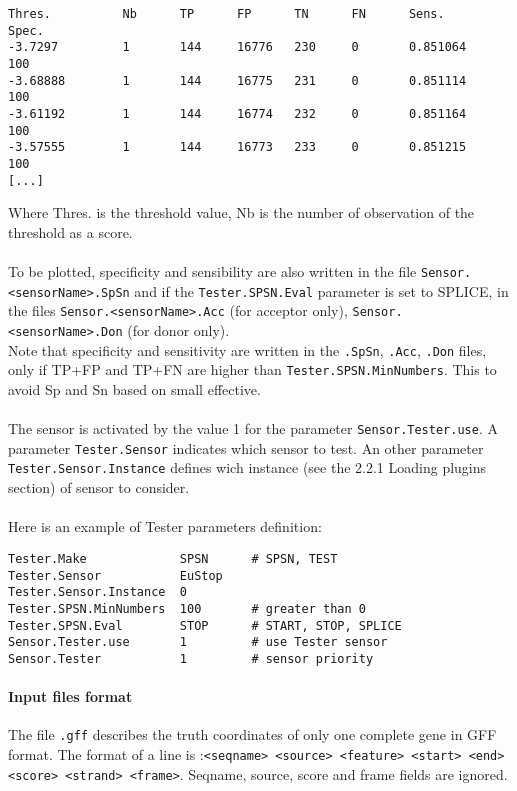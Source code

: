 \begin{Verbatim}[fontsize=\small]
Thres.          Nb      TP      FP      TN      FN      Sens.           Spec.
-3.7297         1       144     16776   230     0       0.851064        100
-3.68888        1       144     16775   231     0       0.851114        100
-3.61192        1       144     16774   232     0       0.851164        100
-3.57555        1       144     16773   233     0       0.851215        100
[...]
\end{Verbatim}
Where Thres. is the threshold value, Nb is the number of observation of the threshold as a score.\\ 
\\ 
To be plotted, specificity and sensibility are also written in the file \texttt{Sensor.<sensorName>.SpSn} and if the \texttt{Tester.SPSN.Eval} parameter is set to SPLICE, in the files 
\texttt{Sensor.<sensorName>.Acc} (for acceptor only), \texttt{Sensor.<sensorName>.Don} (for donor only).\\ 
Note that specificity and sensitivity are written in the \texttt{.SpSn}, \texttt{.Acc}, \texttt{.Don} files, only if TP+FP and TP+FN are higher than \texttt{Tester.SPSN.MinNumbers}. This to avoid Sp and Sn based on small effective.\\
\\
The sensor is activated by the value 1 for the parameter
\texttt{Sensor.Tester.use}. A parameter \texttt{Tester.Sensor} indicates which sensor to test. An other parameter \texttt{Tester.Sensor.Instance} defines wich instance (see the 2.2.1 Loading plugins section) of sensor to consider.\\
\\
Here is an example of Tester parameters definition:
\begin{Verbatim}[fontsize=\small]
Tester.Make             SPSN      # SPSN, TEST
Tester.Sensor           EuStop
Tester.Sensor.Instance  0
Tester.SPSN.MinNumbers  100       # greater than 0
Tester.SPSN.Eval        STOP      # START, STOP, SPLICE
Sensor.Tester.use       1         # use Tester sensor
Sensor.Tester           1         # sensor priority
\end{Verbatim}

\paragraph{Input files format}

The file \texttt{.gff} describes the truth coordinates of only one complete gene in GFF format. The format of a
line is :\texttt{<seqname> <source> <feature> <start> <end> <score> <strand> <frame>}. Seqname, source, score and frame fields are ignored.

